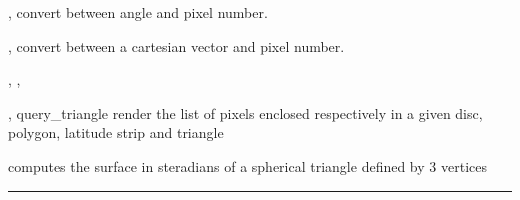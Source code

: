\begin{related}
  \begin{sulist}{} %
  \item[\htmlref{pix2ang}{sub:pix_tools}, \htmlref{ang2pix}{sub:pix_tools}] convert between angle and pixel number.
  \item[\htmlref{pix2vec}{sub:pix_tools}, \htmlref{vec2pix}{sub:pix_tools}] convert between a cartesian vector and pixel number.
  \item[\htmlref{query\_disc}{sub:query_disc}, \htmlref{query\_polygon}{sub:query_polygon},]
  \item[\htmlref{query\_strip}{sub:query_strip}, query\_triangle] render the list of pixels enclosed
  respectively in a given disc, polygon, latitude strip and triangle
  \item[\htmlref{surface\_triangle}{sub:surface_triangle}] computes the surface
in steradians of a spherical triangle defined by 3 vertices

  \end{sulist}
\end{related}

\rule{\hsize}{2mm}

\newpage
